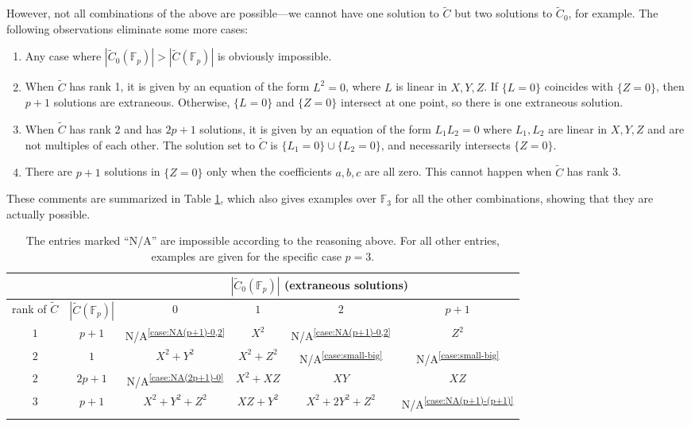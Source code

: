 \documentclass[10pt,a4paper]{amsart}
\numberwithin{equation}{section}
\numberwithin{figure}{section}
\numberwithin{table}{section}
\theoremstyle{definition}
\theoremstyle{plain}
\theoremstyle{remark}
\theoremstyle{plain}
\theoremstyle{definition}
\theoremstyle{plain}
\theoremstyle{plain}
\newcommand{\F}{\mathbb{F}}
\begin{document}
	However, not all combinations of the above are possible---we cannot have one solution to $\widetilde{C}$ but two solutions to $\widetilde{C}_0$, for example. The following observations eliminate some more cases:
	\begin{enumerate}
		\item\label{case:small-big} Any case where $|\widetilde{C}_0(\F_p)| > |\widetilde{C}(\F_p)|$ is obviously impossible.
		\item\label{case:NA(p+1)-0,2} When $\widetilde{C}$ has rank 1, it is given by an equation of the form $L^2 = 0$, where $L$ is linear in $X,Y,Z$. If $\{L=0\}$ coincides with $\{Z = 0\}$, then $p+1$ solutions are extraneous. Otherwise, $\{L=0\}$ and $\{Z=0\}$ intersect at one point, so there is one extraneous solution.
		\item\label{case:NA(2p+1)-0} When $\widetilde{C}$ has rank 2 and has $2p + 1$ solutions, it
		is given by an equation of the form $L_1 L_2 = 0$ where $L_1,L_2$ are linear in $X,Y,Z$ and are not multiples of each other. The solution set to $\widetilde{C}$ is $\{L_1 = 0\}\cup\{L_2 = 0\}$, and necessarily intersects $\{Z = 0\}$.
		\item\label{case:NA(p+1)-(p+1)} There are $p+1$ solutions in $\{Z = 0\}$ only when the 
		coefficients $a,b,c$ are all zero. This cannot happen when $\widetilde{C}$ has rank 3.
	\end{enumerate}
	These comments are summarized in Table \ref{table:all-possibilities}, which also gives examples over $\F_3$ for all the other combinations, showing that they are actually possible.
	
	\begin{table}[h]
		\begin{tabular}{c|c|c|c|c|c}  \multicolumn{2}{c|}{} &
			\multicolumn{4}{c}{\small{$|\widetilde{C}_0(\F_p)|$ (extraneous solutions)}}  \\ \hline
			\small{rank of $\widetilde{C}$} & \small{$|\widetilde{C}(\F_p)|$} & $0$ & $1$ & $2$ & $p + 1$\\
			\hline \hline
			$1$ & $p+1$ & N/A\textsuperscript{\eqref{case:NA(p+1)-0,2}} & $X^2$ & N/A\textsuperscript{\eqref{case:NA(p+1)-0,2}} & $Z^2$ \\
			\hline
			$2$ & $1$ & $X^2 + Y^2$ & $X^2 + Z^2$ & N/A\textsuperscript{\eqref{case:small-big}} & N/A\textsuperscript{\eqref{case:small-big}} \\
			\hline
			$2$ &	$2p+1$ & N/A\textsuperscript{\eqref{case:NA(2p+1)-0}} & $X^2 + XZ$ & $XY$ & $XZ$ \\
			\hline
			$3$ & $p+1$ & $X^2 + Y^2 + Z^2$ & $XZ+Y^2$ & $X^2 + 2Y^2 + Z^2$ & N/A\textsuperscript{\eqref{case:NA(p+1)-(p+1)}} \\
			\hline
			\multicolumn{2}{c}{}
		\end{tabular}
		\caption{The entries marked ``N/A'' are impossible according to the reasoning above. For all other entries, examples are given for the specific case
			$p=3$.}\label{table:all-possibilities}
	\end{table}
	
\end{document}
